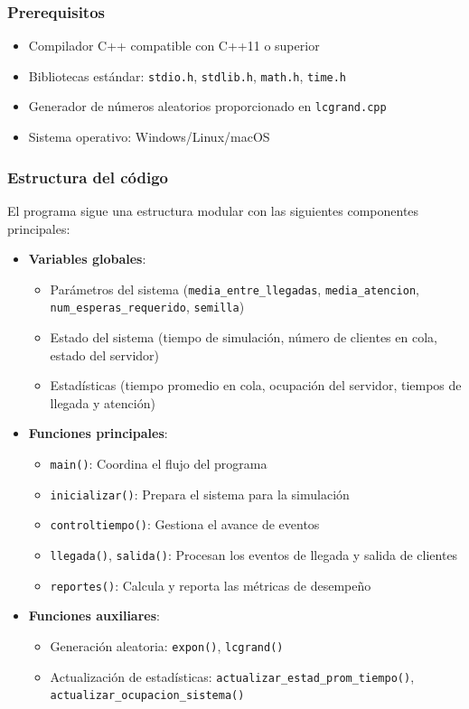 \documentclass{article}
\begin{document}
\subsubsection{Prerequisitos}

\begin{itemize}
    \item Compilador C++ compatible con C++11 o superior
    \item Bibliotecas estándar: \texttt{stdio.h}, \texttt{stdlib.h}, \texttt{math.h}, \texttt{time.h}
    \item Generador de números aleatorios proporcionado en \texttt{lcgrand.cpp}
    \item Sistema operativo: Windows/Linux/macOS
\end{itemize}

\subsubsection{Estructura del código}

El programa sigue una estructura modular con las siguientes componentes principales:

\begin{itemize}
    \item \textbf{Variables globales}:
    \begin{itemize}
        \item Parámetros del sistema (\texttt{media\_entre\_llegadas}, \texttt{media\_atencion}, \texttt{num\_esperas\_requerido}, \texttt{semilla})
        \item Estado del sistema (tiempo de simulación, número de clientes en cola, estado del servidor)
        \item Estadísticas (tiempo promedio en cola, ocupación del servidor, tiempos de llegada y atención)
    \end{itemize}
    
    \item \textbf{Funciones principales}:
    \begin{itemize}
        \item \texttt{main()}: Coordina el flujo del programa
        \item \texttt{inicializar()}: Prepara el sistema para la simulación
        \item \texttt{controltiempo()}: Gestiona el avance de eventos
        \item \texttt{llegada()}, \texttt{salida()}: Procesan los eventos de llegada y salida de clientes
        \item \texttt{reportes()}: Calcula y reporta las métricas de desempeño
    \end{itemize}
    
    \item \textbf{Funciones auxiliares}:
    \begin{itemize}
        \item Generación aleatoria: \texttt{expon()}, \texttt{lcgrand()}
        \item Actualización de estadísticas: \texttt{actualizar\_estad\_prom\_tiempo()}, \texttt{actualizar\_ocupacion\_sistema()}
    \end{itemize}
\end{itemize}
\end{document}
